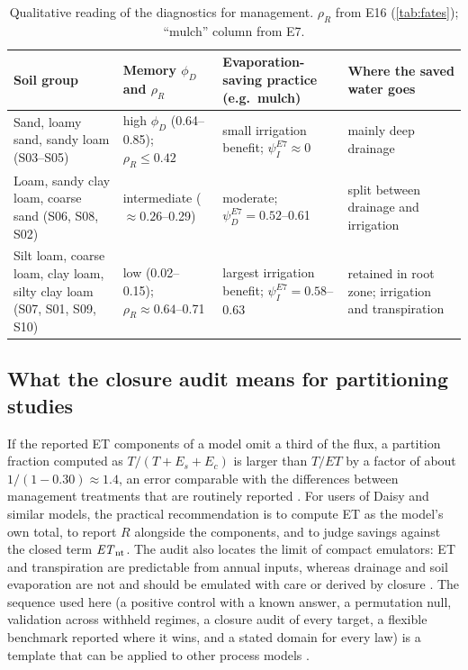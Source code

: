 \documentclass[review,12pt,authoryear]{elsarticle}
\begin{document}
\begin{table}[!htbp]\centering\small
\caption{Qualitative reading of the diagnostics for management. $\rho_R$ from E16 (\cref{tab:fates}); ``mulch'' column from E7.}
\label{tab:mgmt}
\begin{tabularx}{\textwidth}{>{\raggedright\arraybackslash}p{3.3cm}>{\raggedright\arraybackslash}X>{\raggedright\arraybackslash}X>{\raggedright\arraybackslash}X}
\toprule
Soil group & Memory $\phi_D$ and $\rho_R$ & Evaporation-saving practice (e.g.\ mulch) & Where the saved water goes\\\midrule
Sand, loamy sand, sandy loam (S03--S05) & high $\phi_D$ (0.64--0.85); $\rho_R\le0.42$ & small irrigation benefit; $\psi_I^{E7}\approx0$ & mainly deep drainage\\
Loam, sandy clay loam, coarse sand (S06, S08, S02) & intermediate ($\approx0.26$--0.29) & moderate; $\psi_D^{E7}=0.52$--0.61 & split between drainage and irrigation\\
Silt loam, coarse loam, clay loam, silty clay loam (S07, S01, S09, S10) & low (0.02--0.15); $\rho_R\approx0.64$--0.71 & largest irrigation benefit; $\psi_I^{E7}=0.58$--0.63 & retained in root zone; irrigation and transpiration\\\bottomrule
\end{tabularx}
\end{table}

\subsection{What the closure audit means for partitioning studies}
If the reported ET components of a model omit a third of the flux, a partition fraction computed as $T/(T+E_s+E_c)$ is larger than $T/\mathit{ET}$ by a factor of about $1/(1-0.30)\approx1.4$, an error comparable with the differences between management treatments that are routinely reported \citep{Jasechko2013,Schlesinger2014,Good2015,BalwinderSingh2011}. For users of Daisy and similar models, the practical recommendation is to compute ET as the model's own total, to report $R$ alongside the components, and to judge savings against the closed term $\mathit{ET}_{\mathrm{nt}}$. The audit also locates the limit of compact emulators: ET and transpiration are predictable from annual inputs, whereas drainage and soil evaporation are not and should be emulated with care or derived by closure \citep{Razavi2012,Asher2015}. The sequence used here (a positive control with a known answer, a permutation null, validation across withheld regimes, a closure audit of every target, a flexible benchmark reported where it wins, and a stated domain for every law) is a template that can be applied to other process models \citep{Roberts2017,Rudin2019,Bennett2013,Moriasi2007,Hutton2016}.
\end{document}
